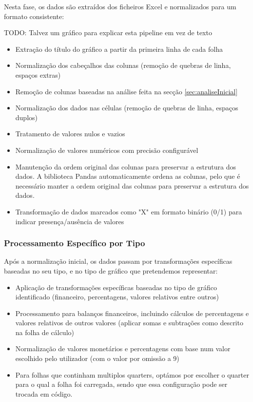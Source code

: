 Nesta fase, os dados são extraídos dos ficheiros Excel e normalizados para um formato consistente:

TODO: Talvez um gráfico para explicar esta pipeline em vez de texto

\begin{itemize}
    \item Extração do título do gráfico a partir da primeira linha de cada folha
    \item Normalização dos cabeçalhos das colunas (remoção de quebras de linha, espaços extras)
    \item Remoção de colunas baseadas na análise feita na secção \ref{sec:analiseInicial}
    \item Normalização dos dados nas células (remoção de quebras de linha, espaços duplos)
    \item Tratamento de valores nulos e vazios
    \item Normalização de valores numéricos com precisão configurável
    \item Manutenção da ordem original das colunas para preservar a estrutura dos dados. A biblioteca Pandas automaticamente ordena as colunas, pelo que é necessário manter a ordem original das colunas para preservar a estrutura dos dados.
    \item Transformação de dados marcados como "X" em formato binário (0/1) para indicar presença/ausência de valores
\end{itemize}

\subsubsection{Processamento Específico por Tipo}
Após a normalização inicial, os dados passam por transformações específicas baseadas no seu tipo, e no tipo de gráfico que pretendemos representar:
\begin{itemize}
    \item Aplicação de transformações específicas baseadas no tipo de gráfico identificado (financeiro, percentagens, valores relativos entre outros)
    \item Processamento para balanços financeiros, incluindo cálculos de percentagens e valores relativos de outros valores (aplicar somas e subtrações como descrito na folha de cálculo)
    \item Normalização de valores monetários e percentagens com base num valor escolhido pelo utilizador (com o valor por omissão a 9)
    \item Para folhas que continham multiplos quarters, optámos por escolher o quarter para o qual a folha foi carregada, sendo que essa configuração pode ser trocada em código.
\end{itemize}


